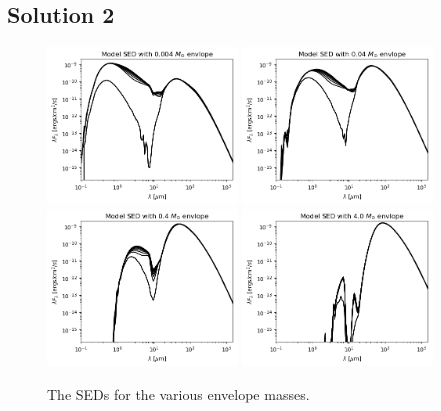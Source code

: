 \documentclass[11pt]{article}
\newenvironment{tight_enumerate}{
    \begin{enumerate}[label=(\alph*)]
    \setlength{\itemsep}{3pt}
    \setlength{\parskip}{0pt}}
    {\end{enumerate}}
\begin{document}
\subsection*{Solution 2}
\begin{tight_enumerate}
\item 
\begin{figure}[h]
\centering
\includegraphics[width=0.45\textwidth]{model_0004_sed.png}
\includegraphics[width=0.45\textwidth]{model_004_sed.png}
\includegraphics[width=0.45\textwidth]{model_04_sed.png}
\includegraphics[width=0.45\textwidth]{model_4_sed.png}
\caption{The SEDs for the various envelope masses.}

\end{figure}
\end{tight_enumerate}
\end{document}
